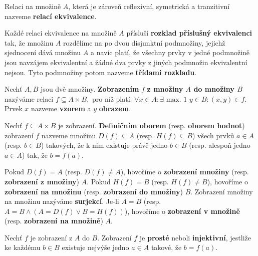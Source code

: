 \begin{definition}
  Relaci na množině $A$, která je zároveň reflexivní, symetrická a tranzitivní nazveme \textbf{relací ekvivalence}.
\end{definition}

\begin{pozn}
  Každé relaci ekvivalence na množině $A$ přísluší \textbf{rozklad příslušný ekvivalenci} tak, že množinu $A$ rozdělíme na po dvou disjunktní podmnožiny, jejichž sjednocení dává množinu $A$ a navíc platí, že všechny prvky v jedné podmnožině jsou navzájem ekvivalentní a žádné dva prvky z jiných podmnožin ekvivalentní nejsou. Tyto podmnožiny potom nazveme \textbf{třídami rozkladu}.
\end{pozn}

\begin{definition}
  Nechť $A,B$ jsou dvě množiny. \textbf{Zobrazením} $f$ \textbf{z množiny $A$ do množiny $B$} nazýváme relaci $f\subseteq A \times B,$ pro níž platí: $\forall x \in A: \exists \text{ max. 1 } y \in B: (x,y) \in f$. Prvek $x$ nazveme \textbf{vzorem} a $y$ \textbf{obrazem}.
\end{definition}

\begin{definition}
  Nechť $f\subseteq A\times B$ je zobrazení. \textbf{Definičním oborem} (resp. \textbf{oborem hodnot}) zobrazení $f$ nazveme množinu $D(f)\subseteq A$
  (resp. $H(f)\subseteq B$) všech prvků $a\in A$ (resp. $b\in B$) takových, že k nim existuje právě jedno $b\in B$ (resp. alespoň jedno $a\in A$) tak, že $b=f(a)$.
\end{definition}

\begin{definition}
  Pokud $D(f) = A$ (resp. $D(f)\ne A$), hovoříme o \textbf{zobrazení množiny} (resp. \textbf{zobrazení z množiny}) $A$. Pokud $H(f)=B$ (resp. $H(f)\ne B$), hovoříme o \textbf{zobrazení na množinu} (resp. \textbf{zobrazení do množiny}) $B$.
  Zobrazení množiny na množinu nazýváme \textbf{surjekcí}. Je-li $A=B$ (resp. $A=B \land ( A = D(f) \lor B = H(f))$), hovoříme o \textbf{zobrazení v množině} (resp. \textbf{zobrazení na množině}) $A$.
\end{definition}

\begin{definition}
  Nechť $f$ je zobrazení z $A$ do $B$. Zobrazení $f$ je \textbf{prosté} neboli \textbf{injektivní}, jestliže ke každému $b\in B$ existuje nejvýše jedno $a \in A$ takové, že $b=f(a).$
\end{definition}

